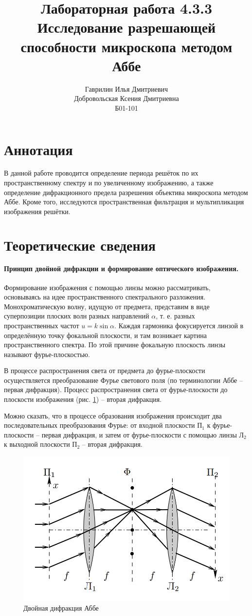 \documentclass[a4paper, 12pt]{article}%
\author{Гаврилин Илья Дмитриевич \\
		Добровольская  Ксения Дмитриевна\\
	Б01-101}
\title{\textbf{Лабораторная работа 4.3.3\\ 
		Исследование разрешающей способности микроскопа методом Аббе}}
\begin{document}
	\maketitle
	\section{Аннотация}
	
	В данной работе проводится определение периода решёток по их пространственному спектру и по увеличенному изображению, а также определение дифракционного предела разрешения объектива микроскопа методом Аббе. Кроме того, исследуются пространственная фильтрация и мультипликация изображения решётки.
	
	\section{Теоретические сведения}
	
	\paragraph{Принцип двойной дифракции и формирование оптического	изображения.}
	
	Формирование изображения с помощью линзы можно рассматривать, основываясь на идее пространственного спектрального разложения. Монохроматическую волну, идущую от предмета, представим в виде суперпозиции плоских волн разных направлений $ \alpha $, т. е. разных пространственных частот $ u = k \sin \alpha $. Каждая гармоника фокусируется линзой в определённую точку фокальной плоскости, и там возникает картина пространственного спектра. По этой причине фокальную плоскость линзы называют фурье-плоскостью.
	
	В процессе распространения света от предмета до фурье-плоскости осуществляется преобразование Фурье светового поля (по терминологии Аббе -- первая дифракция). Процесс распространения света от фурье-плоскости до плоскости изображения (рис. \ref{fig:screenshot1}) -- вторая дифракция.
	
	Можно сказать, что в процессе образования изображения происходит два последовательных преобразования Фурье: от входной плоскости $ П_1 $ к фурье-плоскости -- первая дифракция, и затем от фурье-плоскости с помощью линзы $ Л_2 $ к выходной плоскости $ П_2 $ -- вторая дифракция.
	
	\begin{figure}[H]
		\centering
		\includegraphics[width=0.7\linewidth]{Screenshot_1}
		\caption{Двойная дифракция Аббе}
		\label{fig:screenshot1}
	\end{figure}
	
\end{document}
